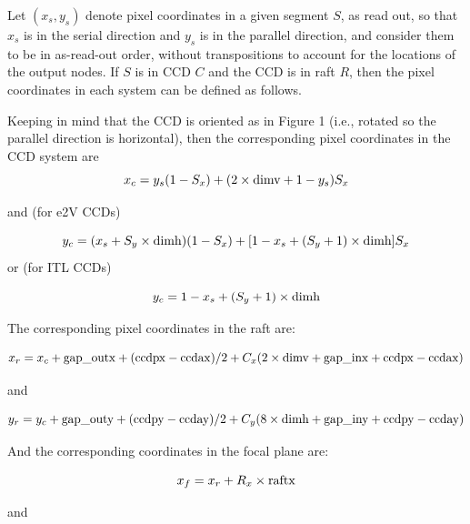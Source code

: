 \documentclass{article}[12pt]
\newcommand{\red}{\textcolor{red}}
\begin{document}

Let $(x_s, y_s)$ denote pixel coordinates in a given segment $S$, as read out, so that $x_s$ is in the serial direction and $y_s$ is in the parallel direction, and consider them to be in as-read-out order, without transpositions to account for the locations of the output nodes.  If $S$ is in CCD $C$ and the CCD is in raft $R$, then the pixel coordinates in each system can be defined as follows.

Keeping in mind that the CCD is oriented as in Figure 1 (i.e., rotated so the parallel direction is horizontal), then the corresponding pixel coordinates in the CCD system are 
\begin{equation}
x_c = y_s (1 - S_x) + (2 \times {\rm dimv} + 1 - y_s)  S_x
\end{equation}

and (for e2V CCDs)

\begin{equation}
y_c = (x_s + S_y \times {\rm dimh})  (1 - S_x) + [1 - x_s + (S_y + 1) \times {\rm dimh}] S_x
\end {equation}
or (for ITL CCDs)

\begin{equation}
y_c = 1 - x_s + (S_y  + 1) \times {\rm dimh} 
\end{equation}

The corresponding pixel coordinates in the raft are:

\begin{equation}
x_r = x_c + {\rm gap\_outx} + ({\rm ccdpx} - {\rm ccdax})/2 + C_x ( 2 \times {\rm dimv} + {\rm gap\_inx} + {\rm ccdpx} - {\rm ccdax})
\end{equation}

and

\begin{equation}
y_r = y_c + {\rm gap\_outy} + ({\rm ccdpy} - {\rm ccday})/2 + C_y ( 8 \times {\rm dimh} + {\rm gap\_iny} + {\rm ccdpy} - {\rm ccday})
\end{equation}

And the corresponding coordinates in the focal plane are:

\begin{equation}
x_f = x_r + R_x \times {\rm raftx}
\end{equation}

and
\end{document}
